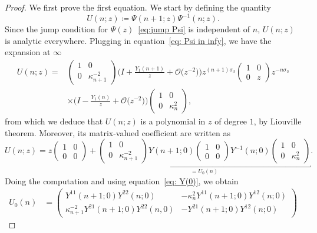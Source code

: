 \documentclass[pdftex]{sigma}%
\numberwithin{equation}{section}
\begin{document}
	\begin{proof}
		We first prove the first equation. We start by defining the quantity
\[
U(n;z)\coloneqq \Psi(n+1;z)\Psi^{-1}(n;z).
\]
Since the jump condition for $\Psi(z)$~\eqref{eq:jump Psi} is independent of $n$, $U(n;z)$ is analytic everywhere. Plugging in equation~\eqref{eq: Psi in infy}, we have the expansion at $\infty$
\begin{align*}
U(n;z) = {}&\begin{pmatrix}
			1&0\\
			0& \kappa_{n+1}^{-2}
		\end{pmatrix}\bigg(I+\frac{Y_1(n+1)}{z} + \mathcal{O}\big(z^{-2}\big)\bigg)z^{(n+1)\sigma_3}\begin{pmatrix}1&0\\0&z
		\end{pmatrix}z^{-n\sigma_3}
\\
&\times \bigg(I-\frac{Y_1(n)}{z} + \mathcal{O}\big(z^{-2}\big)\bigg)\begin{pmatrix}
			1&0\\
			0& \kappa_{n}^{2}
		\end{pmatrix}\!,
\end{align*}
from which we deduce that $U(n;z)$ is a polynomial in $z$ of degree $1$, by Liouville theorem. Moreover, its matrix-valued coefficient are written as
		\begin{equation*}
			U(n;z)=z\begin{pmatrix}
				1&0\\
				0&0
			\end{pmatrix}+\underbracket{\begin{pmatrix}
					1&0\\
					0& \kappa_{n+1}^{-2}
				\end{pmatrix}Y(n+1;0)\begin{pmatrix}
					1&0\\0&0
				\end{pmatrix}Y^{-1}(n;0)\begin{pmatrix}
					1&0\\
					0& \kappa_{n}^{2}
			\end{pmatrix}}_{=U_0(n)}.
		\end{equation*}
		Doing the computation and using equation~\eqref{eq: Y(0)}, we obtain
		\begin{align*}
U_0(n) &= \begin{pmatrix}
			Y^{11}(n+1;0)Y^{22}(n;0) &-\kappa_n^2Y^{11}(n+1;0)Y^{12}(n;0)\\
			\kappa_{n+1}^{-2}Y^{21}(n+1;0)Y^{22}(n,0)&-Y^{21}(n+1;0)Y^{12}(n;0)

\end{pmatrix}
\end{align*}
\end{proof}
\end{document}
